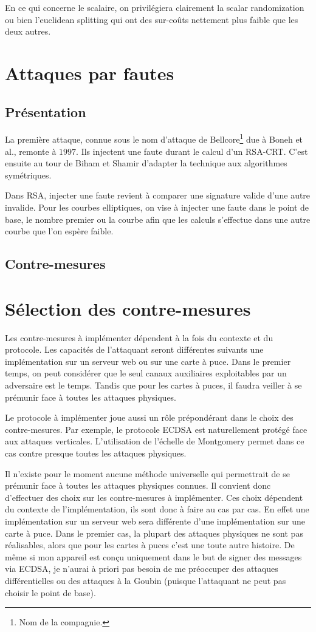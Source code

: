 En ce qui concerne le scalaire, on privilégiera clairement la scalar randomization ou bien l'euclidean splitting qui ont des sur-coûts nettement plus faible que les deux autres. 

\section{Attaques par fautes}
\subsection{Présentation}
La première attaque, connue sous le nom d'attaque de Bellcore\footnote{Nom de la compagnie.} due à Boneh et al., remonte à $1997$. Ils injectent une faute durant le calcul d'un RSA-CRT. C'est ensuite au tour de Biham et Shamir d'adapter la technique aux algorithmes symétriques. 

Dans RSA, injecter une faute revient à comparer une signature valide d'une autre invalide. Pour les courbes elliptiques, on vise à injecter une faute dans le point de base, le nombre premier ou la courbe afin que les calculs s'effectue dans une autre courbe que l'on espère faible.

\subsection{Contre-mesures}


\section{Sélection des contre-mesures}
Les contre-mesures à implémenter dépendent à la fois du contexte et du protocole. Les capacités de l'attaquant seront différentes suivants une implémentation sur un serveur web ou sur une carte à puce. Dans le premier temps, on peut considérer que le seul canaux auxiliaires exploitables par un adversaire est le temps. Tandis que pour les cartes à puces, il faudra veiller à se prémunir face à toutes les attaques physiques. 

Le protocole à implémenter joue aussi un rôle prépondérant dans le choix des contre-mesures. Par exemple, le protocole ECDSA est naturellement protégé face aux attaques verticales. L'utilisation de l'échelle de Montgomery permet dans ce cas contre presque toutes les attaques physiques.

Il n'existe pour le moment aucune méthode universelle qui permettrait de se prémunir face à toutes les attaques physiques connues. Il convient donc d'effectuer des choix sur les contre-mesures à implémenter. Ces choix dépendent du contexte de l'implémentation, ils sont donc à faire au cas par cas. En effet une implémentation sur un serveur web sera différente d'une implémentation sur une carte à puce. Dans le premier cas, la plupart des attaques physiques ne sont pas réalisables, alors que pour les cartes à puces c'est une toute autre histoire. De même si mon appareil est conçu uniquement dans le but de signer des messages via ECDSA, je n'aurai à priori pas besoin de me préoccuper des attaques différentielles ou des attaques à la Goubin (puisque l'attaquant ne peut pas choisir le point de base).

